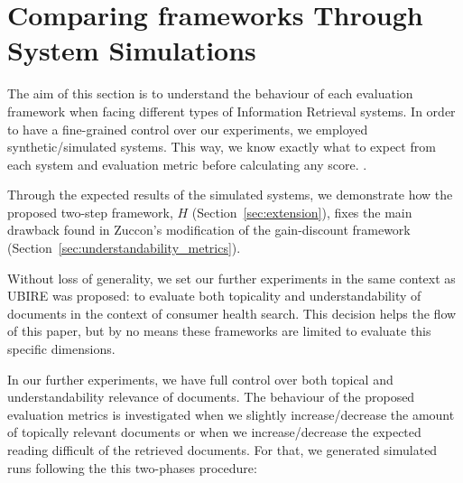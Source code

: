 
\section{Comparing frameworks Through System Simulations}
\label{sec:simulations}


The aim of this section is to understand the behaviour of each evaluation framework when facing different types of Information Retrieval systems.
In order to have a fine-grained control over our experiments, we employed synthetic/simulated systems.
This way, we know exactly what to expect from each system and evaluation metric before calculating any score.
.

Through the expected results of the simulated systems, we demonstrate how the proposed two-step framework, $H$ (Section~\ref{sec:extension}), fixes the main drawback found in Zuccon's modification of the gain-discount framework (Section~\ref{sec:understandability_metrics}). 

Without loss of generality, we set our further experiments in the same context as UBIRE was proposed: to evaluate both topicality and understandability of documents in the context of consumer health search. This decision helps the flow of this paper, but by no means these frameworks are limited to evaluate this specific dimensions. 

In our further experiments, we have full control over both topical and understandability relevance of documents. 
The behaviour of the proposed evaluation metrics is investigated when we slightly increase/decrease the amount of topically relevant documents or when we increase/decrease the expected reading difficult of the retrieved documents. 
For that, we generated simulated runs following the this two-phases procedure:


